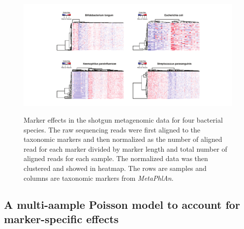 \begin{figure}[htb]
	\centering
	{\includegraphics[scale=0.95,trim=80 0 0 0,clip]{Figure/F31_Marker_Effects.pdf}}
	\caption[Marker effects in the shotgun metagenomic data for four bacterial species]{Marker effects in the shotgun metagenomic data for four bacterial species. The raw sequencing reads were first aligned to the taxonomic markers and then normalized as the number of aligned read for each marker divided by marker length and total number of aligned reads for each sample. The normalized data was then clustered and showed in heatmap. The rows are  samples and columns are taxonomic markers from {\it MetaPhlAn}. }
	\label{F31_Marker_Effects}
\end{figure}



\subsection{A multi-aample Poisson model to account for marker-specific effects}



